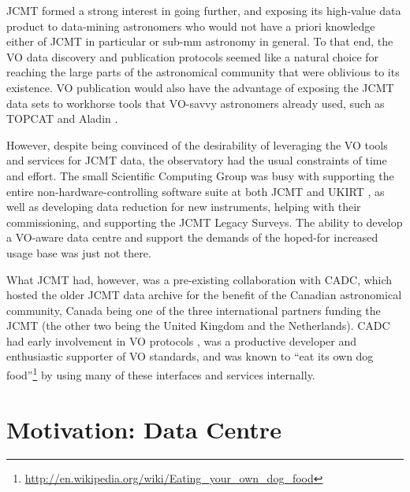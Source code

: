 \documentclass[final,authoryear,5p,times,twocolumn]{elsarticle}
\begin{document}
JCMT formed a strong interest in going further, and exposing its
high-value data product to data-mining astronomers who would not have
a priori knowledge either of JCMT in particular or sub-mm astronomy in
general. To that end, the VO data discovery and publication protocols
seemed like a natural choice for reaching the large parts of the
astronomical community that were oblivious to its existence. VO
publication would also have the advantage of exposing the JCMT data
sets to workhorse tools that VO-savvy astronomers already used, such
as TOPCAT \citep[][]{2005ASPC..347...29T} and Aladin
\citep[][]{2005ASPC..347..193O}.

However, despite being convinced of the desirability of
leveraging the VO tools and services for JCMT data, the observatory
had the usual constraints of time and effort. The small Scientific
Computing Group was busy with supporting the entire non-hardware-controlling
software suite at both JCMT and UKIRT \citep[see e.g.,][with both
telescopes operated by the same organization]{2002SPIE.4844..321E,2011tfa..confE..42J},
as well as developing data reduction for new instruments, helping with
their commissioning,
and supporting the JCMT Legacy Surveys. The ability to develop a
VO-aware data centre and support the demands of the hoped-for
increased usage base was just not there.

What JCMT had, however, was a pre-existing collaboration with CADC,
which hosted the older JCMT data archive \citep{1997ASPC..125..397T}
for the benefit of the Canadian astronomical community, Canada being
one of the three international partners funding the JCMT (the other
two being the United Kingdom and the Netherlands). CADC had early
involvement in VO protocols \citep{2002ASPC..281...36S,2014ACCADC}, was a
productive developer and enthusiastic supporter of VO standards, and
was known to ``eat its own dog
food''\footnote{\url{http://en.wikipedia.org/wiki/Eating_your_own_dog_food}}
by using many of these
interfaces and services internally.

\section{Motivation: Data Centre}
\end{document}
